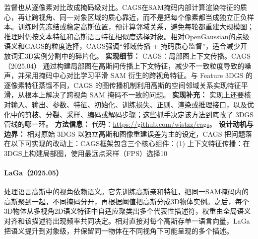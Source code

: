 监督也从逐像素对比改成掩码级对比。CAGS在SAM掩码内部计算渲染特征的质心，再让跨视角、同一对象区域的质心靠近，而不是把每个像素都当成独立正负样本。训练时先冻结或稳定高斯位置，预计算邻域关系，避免每轮都重建大规模图；推理时仍按文本特征和高斯语言特征相似度选择对象。相对OpenGaussian的点级语义和GAGS的粒度选择，CAGS强调“邻域传播 + 掩码质心监督”，适合减少开放词汇3D实例分割中的碎片化。
\textbf{实现细节：} CAGS：局部图上下文传播。CAGS（2025.04） 通过构建局部图在高斯间传播上下文特征，减少不一致粒度导致的噪声，并采用掩码中心对比学习平滑 SAM 衍生的跨视角特征。与 Feature 3DGS 的逐像素特征蒸馏不同，CAGS 的图传播机制利用高斯的空间邻域关系实现特征平滑，从根本上解决了跨视角 SAM 掩码不一致的问题。
\textbf{实现补充：} 实现上还要核对输入、输出、参数、特征、初始化、训练损失、正则、渲染或推理接口，以及优化中的剪枝、分裂、采样、编码或解码步骤；这些抓手决定该方法到底改了 3DGS 管线的哪一环。
\textbf{方法信息：} 代码：\url{https://github.com/wistzz/cags}。
\textbf{设计动机与边界：} 相对原始 3DGS 以独立高斯和图像重建误差为主的设定，CAGS 把问题落在以下可实现的改动上：CAGS框架包含三个核心组件：(1) 上下文特征传播：在3DGS上构建局部图，使用最远点采样（FPS）选择10%
\paragraph{LaGa（2025.05）\cite{2505_24746}}
处理语言高斯中的视角依赖语义。它先训练高斯亲和特征，把同一SAM掩码内的高斯聚到一起，不同掩码分开，再根据阈值把高斯分成3D物体实例。之后，每个3D物体从多视角2D语义特征中自适应聚类出多个代表性描述符，权重由全局语义对齐和该描述符出现频率共同决定。相对直接对每个高斯存单一语言向量，LaGa把语义提升到对象级，并保留同一物体在不同视角下可能呈现的多个描述。

